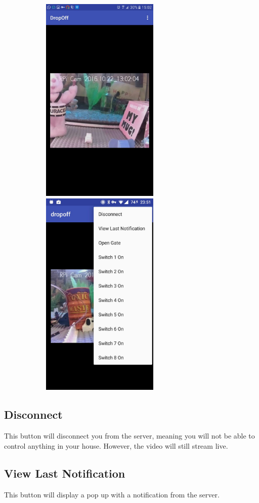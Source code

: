 \documentclass[a4paper,12pt]{article}
\begin{document}
	 \includegraphics[width=10cm,height=10cm,keepaspectratio]{./Pictures/app2.jpeg} \includegraphics[width=10cm,height=10cm,keepaspectratio]{./Pictures/app3.jpeg}\\
	 
	 \subsection{Disconnect}
	 This button will disconnect you from the server, meaning you will not be able to control anything in your house. However, the video will still stream live.
	 \subsection{View Last Notification}
	 This button will display a pop up with a notification from the server.
\end{document}
